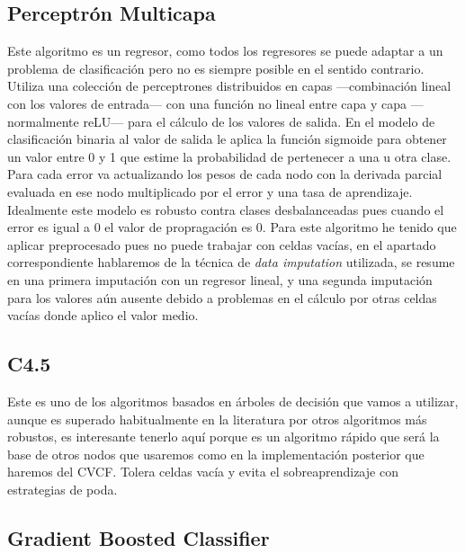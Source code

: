 \documentclass{article}
\newcommand{\img}[2]{
\noindent\makebox[\textwidth][c]{\texttt{[image: \#1]}}%
}
\begin{document}
\img{bayes}{0.5}

\subsection{Perceptrón Multicapa}

Este algoritmo es un regresor, como todos los regresores se puede adaptar a un problema de clasificación pero no es siempre posible en el sentido contrario. Utiliza una colección de perceptrones distribuidos en capas ---combinación lineal con los valores de entrada--- con una función no lineal entre capa y capa ---normalmente reLU--- para el cálculo de los valores de salida. En el modelo de clasificación binaria al valor de salida le aplica la función sigmoide para obtener un valor entre 0 y 1 que estime la probabilidad de pertenecer a una u otra clase. Para cada error va actualizando los pesos de cada nodo con la derivada parcial evaluada en ese nodo multiplicado por el error y una tasa de aprendizaje. Idealmente este modelo es robusto contra clases desbalanceadas pues cuando el error es igual a 0 el valor de propragación es 0. Para este algoritmo he tenido que aplicar preprocesado pues no puede trabajar con celdas vacías, en el apartado correspondiente hablaremos de la técnica de \textit{data imputation} utilizada, se resume en una primera imputación con un regresor lineal, y una segunda imputación para los valores aún ausente debido a problemas en el cálculo por otras celdas vacías donde aplico el valor medio.

\img{mlp}{0.5}

\subsection{C4.5}

Este es uno de los algoritmos basados en árboles de decisión que vamos a utilizar, aunque es superado habitualmente en la literatura por otros algoritmos más robustos, es interesante tenerlo aquí porque es un algoritmo rápido que será la base de otros nodos que usaremos como en la implementación posterior que haremos del CVCF. Tolera celdas vacía y evita el sobreaprendizaje con estrategias de poda.

\img{c45}{0.5}

\subsection{Gradient Boosted Classifier}
\end{document}
